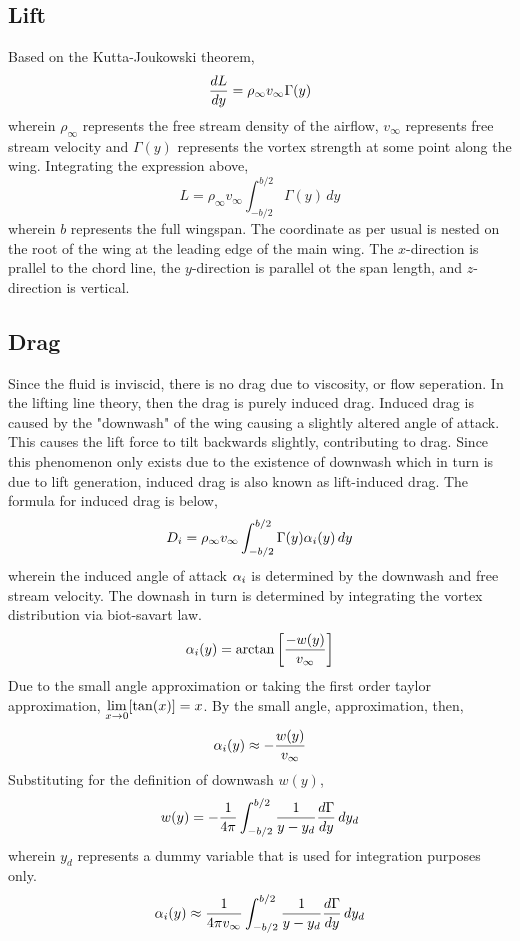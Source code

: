 \documentclass[class=report, 12pt, crop=false]{standalone}
\begin{document}
\begin{center}
\subsection{Lift}
\begin{comment}
\end{comment}
Based on the Kutta-Joukowski theorem,
$$\frac{dL}{dy} = \rho_\infty v_\infty \Gamma(y)$$
wherein $\rho_\infty$ represents the free stream density of the airflow, $v_\infty$ represents free stream velocity and $\Gamma(y)$ represents the vortex strength at some point along the wing. Integrating the expression above,
$$L = \rho_\infty v_\infty\int^{b/2}_{-b/2}\Gamma(y)\,dy$$
wherein $b$ represents the full wingspan. The coordinate as per usual is nested on the root of the wing at the leading edge of the main wing. The $x$-direction is prallel to the chord line, the $y$-direction is parallel ot the span length, and $z$-direction is vertical.
\subsection{Drag}
\begin{comment}
\end{comment}
Since the fluid is inviscid, there is no drag due to viscosity, or flow seperation. In the lifting line theory, then the drag is purely induced drag. Induced drag is caused by the "downwash" of the wing causing a slightly altered angle of attack. This causes the lift force to tilt backwards slightly, contributing to drag. Since this phenomenon only exists due to the existence of downwash which in turn is due to lift generation, induced drag is also known as lift-induced drag. The formula for induced drag is below,
$$D_i = \rho_\infty v_\infty\int^{b/2}_{-b/2}\Gamma(y)\alpha_i(y)\,dy$$
wherein the induced angle of attack $\alpha_i$ is determined by the downwash and free stream velocity. The downash in turn is determined by integrating the vortex distribution via biot-savart law.
$$\alpha_i(y) = \arctan\left[\frac{-w(y)}{v_\infty}\right]$$
Due to the small angle approximation or taking the first order taylor approximation, $\displaystyle{\lim_{x\to0}[\tan(x)] = x}$. By the small angle, approximation, then,
$$\alpha_i(y) \approx -\frac{w(y)}{v_\infty}$$
Substituting for the definition of downwash $w(y)$,
$$w(y) = -\frac{1}{4\pi}\int^{b/2}_{-b/2}\frac{1}{y-y_d}\frac{d\Gamma}{dy}\, dy_d$$
wherein $y_d$ represents a dummy variable that is used for integration purposes only.
$$\alpha_i(y) \approx \frac{1}{4\pi v_\infty}\int^{b/2}_{-b/2}\frac{1}{y-y_d}\frac{d\Gamma}{dy}\, dy_d$$

\end{center}
\end{document}
